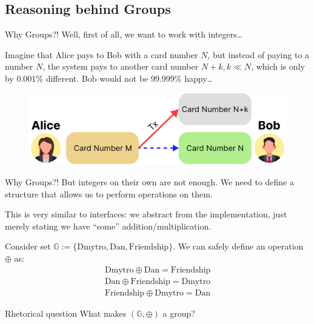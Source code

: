 \documentclass{beamer}
\begin{document}
    \subsection{Reasoning behind Groups}
    \begin{frame}{Why Groups?!}
        Well, first of all, we want to work with integers\ldots

        Imagine that Alice pays to Bob with a card number $N$, but instead of paying to a number $N$, the system pays 
        to another card number $N+k, k \ll N$, which is only by 0.001\% different. Bob would not be 99.999\% happy\ldots

        \begin{figure}
          \includegraphics[width=1.0\textwidth]{images/lecture_1/why_integers.pdf}
          \label{fig:why_integers}
        \end{figure}
    \end{frame}

    \begin{frame}{Why Groups?!}
        But integers on their own are not enough. We need to define a structure that allows us to perform operations on them.

        This is very similar to interfaces: we abstract from the implementation, just merely stating we have ``some'' addition/multiplication.\pause

        \begin{example}
            Consider set $\mathbb{G} := \{\text{Dmytro}, \text{Dan}, \text{Friendship}\}$. We can safely define an operation $\oplus$ as:
            \begin{gather*}
                \text{Dmytro} \oplus \text{Dan} = \text{Friendship} \\ 
                \text{Dan} \oplus \text{Friendship} = \text{Dmytro} \\
                \text{Friendship} \oplus \text{Dmytro} = \text{Dan}
            \end{gather*}
        \end{example}
        \pause

        \begin{block}{Rhetorical question}
            What makes $(\mathbb{G}, \oplus)$ a group?
        \end{block}
    \end{frame}
\end{document}

